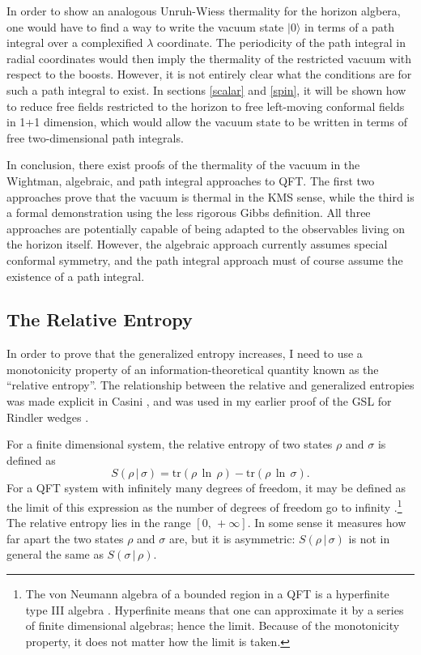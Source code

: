 \documentclass[12pt]{article}
\begin{document}
In order to show an analogous Unruh-Wiess thermality for the horizon algbera, one would have to find a way to write the vacuum state $|0\rangle$ in terms of a path integral over a complexified $\lambda$ coordinate.  The periodicity of the path integral in radial coordinates would then imply the thermality of the restricted vacuum with respect to the boosts.  However, it is not entirely clear what the conditions are for such a path integral to exist.  In sections \ref{scalar} and \ref{spin}, it will be shown how to reduce free fields restricted to the horizon to free left-moving conformal fields in 1+1 dimension, which would allow the vacuum state to be written in terms of free two-dimensional path integrals.

In conclusion, there exist proofs of the thermality of the vacuum in the Wightman, algebraic, and path integral approaches to QFT.  The first two approaches prove that the vacuum is thermal in the KMS sense, while the third is a formal demonstration using the less rigorous Gibbs definition.  All three approaches are potentially capable of being adapted to the observables living on the horizon itself.  However, the algebraic approach currently assumes special conformal symmetry, and the path integral approach must of course assume the existence of a path integral.

\subsection{The Relative Entropy}\label{relative}

In order to prove that the generalized entropy increases, I need to use a monotonicity property of an information-theoretical quantity known as the ``relative entropy''.  The relationship between the relative and generalized entropies was made explicit in Casini \cite{casini08}, and was used in my earlier proof of the GSL for Rindler wedges \cite{rindler}.

For a finite dimensional system, the relative entropy of two states $\rho$ and $\sigma$ is defined as
\begin{equation}\label{relIII}
S(\rho\,|\,\sigma) = \mathrm{tr}(\rho\,\ln\,\rho) - \mathrm{tr}(\rho\,\ln\,\sigma).
\end{equation}
For a QFT system with infinitely many degrees of freedom, it may be defined as the limit of this expression as the number of degrees of freedom go to infinity \cite{araki75}.\footnote{The von Neumann algebra of a bounded region in a QFT is a hyperfinite type III algebra \cite{BAF87}.  Hyperfinite means that one can approximate it by a series of finite dimensional algebras; hence the limit.  Because of the monotonicity property, it does not matter how the limit is taken.}  The relative entropy lies in the range $[0,\,+\infty]$.  In some sense it measures how far apart the two states $\rho$ and $\sigma$ are, but it is asymmetric: $S(\rho\,|\,\sigma)$ is not in general the same as $S(\sigma\,|\,\rho)$.
\end{document}
